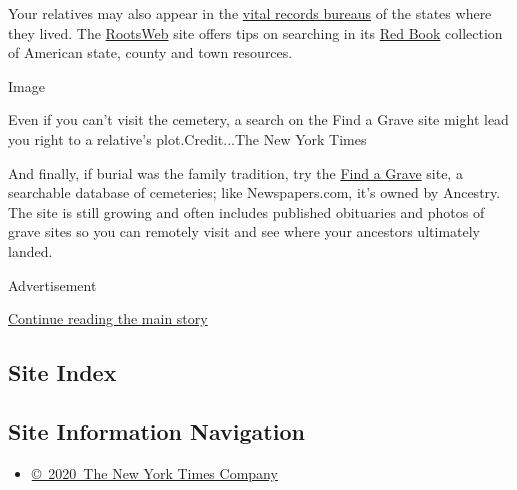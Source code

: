 Your relatives may also appear in the
\href{https://www.familysearch.org/wiki/en/United_States_Vital_Records}{vital
records bureaus} of the states where they lived. The
\href{https://www.rootsweb.com}{RootsWeb} site offers tips on searching
in its
\href{https://wiki.rootsweb.com/wiki/index.php/Red_Book:_American_State,_County,_and_Town_Sources}{Red
Book} collection of American state, county and town resources.

Image

Even if you can't visit the cemetery, a search on the Find a Grave site
might lead you right to a relative's plot.Credit...The New York Times

And finally, if burial was the family tradition, try the
\href{https://www.findagrave.com}{Find a Grave} site, a searchable
database of cemeteries; like Newspapers.com, it's owned by Ancestry. The
site is still growing and often includes published obituaries and photos
of grave sites so you can remotely visit and see where your ancestors
ultimately landed.

Advertisement

\protect\hyperlink{after-bottom}{Continue reading the main story}

\hypertarget{site-index}{%
\subsection{Site Index}\label{site-index}}

\hypertarget{site-information-navigation}{%
\subsection{Site Information
Navigation}\label{site-information-navigation}}

\begin{itemize}
\tightlist
\item
  \href{https://help.nytimes3xbfgragh.onion/hc/en-us/articles/115014792127-Copyright-notice}{©~2020~The
  New York Times Company}
\end{itemize}

